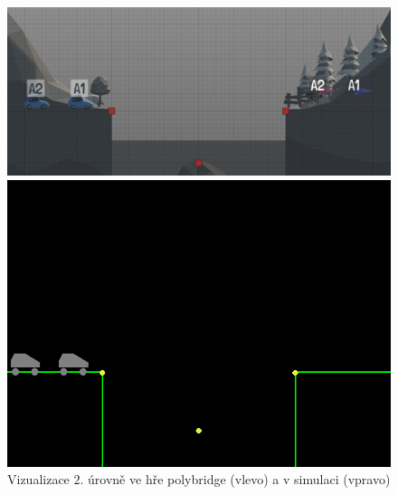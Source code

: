 \begin{figure}[ht]
    \centering
    \begin{minipage}{0.49\textwidth}
        \centering
        \includegraphics[width=\linewidth]{img/poly_lvl2.png}
    \end{minipage}\hfill
    \begin{minipage}{0.49\textwidth}
        \centering
        \includegraphics[width=\linewidth]{img/impl_lvl2.png}
    \end{minipage}
    \caption{Vizualizace $2.$ úrovně ve hře polybridge (vlevo) a v simulaci (vpravo)}
    \label{impl-fig:3}
\end{figure}

